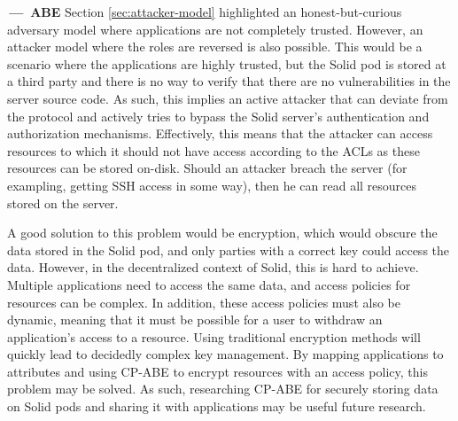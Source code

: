 \begin{futurework}\label{fw:abe}
\textbf{\,---\, \acrlong{ABE}}
Section \ref{sec:attacker-model} highlighted an honest-but-curious adversary model where applications are not completely trusted. However, an attacker model where the roles are reversed is also possible. This would be a scenario where the applications are highly trusted, but the Solid pod is stored at a third party and there is no way to verify that there are no vulnerabilities in the server source code. As such, this implies an active attacker that can deviate from the protocol and actively tries to bypass the Solid server's authentication and authorization mechanisms. Effectively, this means that the attacker can access resources to which it should not have access according to the \gls{ACL}s as these resources can be stored on-disk. Should an attacker breach the server (for exampling, getting SSH access in some way), then he can read all resources stored on the server. 

A good solution to this problem would be encryption, which would obscure the data stored in the Solid pod, and only parties with a correct key could access the data. However, in the decentralized context of Solid, this is hard to achieve. Multiple applications need to access the same data, and access policies for resources can be complex. In addition, these access policies must also be dynamic, meaning that it must be possible for a user to withdraw an application's access to a resource. Using traditional encryption methods will quickly lead to decidedly complex key management. By mapping applications to attributes and using \acrlong{CP-ABE} to encrypt resources with an access policy, this problem may be solved. As such, researching \gls{CP-ABE} for securely storing data on Solid pods and sharing it with applications may be useful future research.



\end{futurework}
